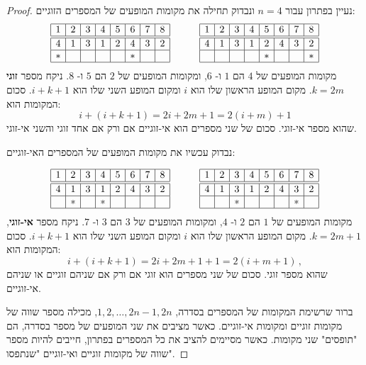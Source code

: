\begin{proof}
נעיין בפתרון עבור
$n=4$
ונבדוק תחילה את מקומות המופעים של המספרים הזוגיים:
\[
\begin{array}{|c|c|c|c|c|c|c|c|}
\hline
1&2&3&4&5&6&7&8\\
\hline\hline
4&1&3&1&2&4&3&2\\\hline
*&&&&&*&&\\\hline
\end{array}
\hspace{3em}
\begin{array}{|c|c|c|c|c|c|c|c|}
\hline
1&2&3&4&5&6&7&8\\
\hline\hline
4&1&3&1&2&4&3&2\\\hline
&&&&*&&&*\\\hline
\end{array}
\]
מקומות המופעים של
$4$
הם
$1$
ו-%
$6$,
ומקומות המופעים של
$2$
הם
$5$
ו-%
$8$.
ניקח מספר
\textbf{זוגי}
$k=2m$. 
מקום המופע הראשון שלו הוא
$i$
ומקום המופע השני שלו הוא
$i+k+1$.
סכום המקומות הוא:
\[
i+(i+k+1)=2i+2m+1=2(i+m)+1
\]
שהוא מספר אי-זוגי.
סכום של שני מספרים הוא אי-זוגיים אם ורק אם אחד זוגי והשני אי-זוגי.

נבדוק עכשיו את מקומות המופעים של המספרים האי-זוגיים:

\[
\begin{array}{|c|c|c|c|c|c|c|c|}
\hline
1&2&3&4&5&6&7&8\\
\hline\hline
4&1&3&1&2&4&3&2\\\hline
&*&&*&&&&\\\hline
\end{array}
\hspace{3em}
\begin{array}{|c|c|c|c|c|c|c|c|}
\hline
1&2&3&4&5&6&7&8\\
\hline\hline
4&1&3&1&2&4&3&2\\\hline
&&*&&&&*&\\\hline
\end{array}
\]
מקומות המופעים של
$1$
הם
$2$
ו-%
$4$,
ומקומות המופעים של
$3$
הם
$3$
ו-%
$7$.
ניקח מספר 
\textbf{אי-זוגי},
$k=2m+1$.
מקום המופע הראשון שלו הוא
$i$
ומקום המופע השני שלו הוא
$i+k+1$.
סכום המקומות הוא:
\[
i+(i+k+1)=2i+2m+1+1=2(i+m+1)\,,
\]
שהוא מספר זוגי.
סכום של שני מספרים הוא זוגי אם ורק אם שניהם זוגיים או שניהם אי-זוגיים.

ברור שרשימת המקומות של המספרים בסדרה,
$1,2,\ldots,2n-1,2n$,
מכילה מספר שווה של מקומות זוגיים ומקומות אי-זוגיים. כאשר מציבים את שני המופעים של מספר בסדרה, הם "תופסים" שני מקומות. כאשר מסיימים להציב את כל המספרים בפתרון, חייבים להיות מספר שווה של מקומות זוגיים ואי-זוגיים "שנתפסו".


\end{proof}
